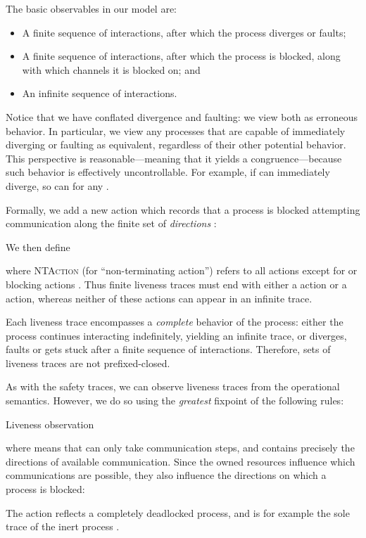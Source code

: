 \documentclass{entcs}
\begin{document}
The basic observables in our model are:
\begin{itemize}
\item A finite sequence of interactions, after which the process
  diverges or faults;
\item A finite sequence of interactions, after which the process
  is blocked, along with which channels it is blocked on; and
\item An infinite sequence of interactions.
\end{itemize}
\noindent
Notice that we have conflated divergence and faulting: we view both as
erroneous behavior.  In particular, we view any processes that are
capable of immediately diverging or faulting as equivalent, regardless
of their other potential behavior.  This perspective is
reasonable---meaning that it yields a congruence---because such
behavior is effectively uncontrollable.  For example, if  can
immediately diverge, so can  for any .

Formally, we add a new action  which records that a
process is blocked attempting
communication along the finite set of \emph{directions} :

We then define

where \textsc{NTAction} (for ``non-terminating action'') refers to all
actions except for  or blocking actions .  Thus
finite liveness traces must end with either a  action
or a  action, whereas neither of these actions can appear in
an infinite trace.

Each liveness trace encompasses a \emph{complete} behavior of the
process: either the process continues interacting indefinitely,
yielding an infinite trace, or diverges, faults or gets stuck after a
finite sequence of interactions.  Therefore, sets of liveness traces
are not prefixed-closed.  

As with the safety traces, we can observe liveness traces from the
operational semantics.  However, we do so using the \emph{greatest}
fixpoint of the following rules:
\begin{display}[]{Liveness observation}

\end{display}
where  means that  can only take
communication steps, and  contains precisely the directions of
available communication.  Since the owned resources influence which
communications are possible, they also influence the directions on
which a process is blocked:

The action  reflects a completely deadlocked
process, and is for example the sole trace of the inert process .
\end{document}
